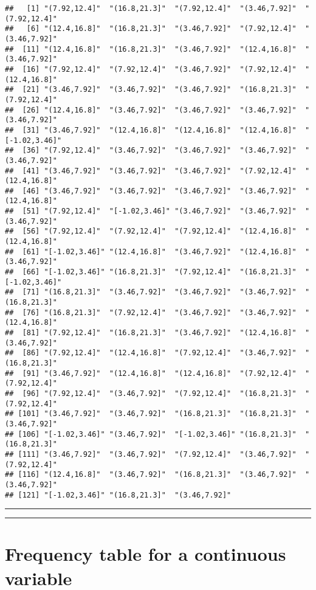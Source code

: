 \documentclass[
]{book}
\begin{document}
\begin{verbatim}
##   [1] "(7.92,12.4]"  "(16.8,21.3]"  "(7.92,12.4]"  "(3.46,7.92]"  "(7.92,12.4]" 
##   [6] "(12.4,16.8]"  "(16.8,21.3]"  "(3.46,7.92]"  "(7.92,12.4]"  "(3.46,7.92]" 
##  [11] "(12.4,16.8]"  "(16.8,21.3]"  "(3.46,7.92]"  "(12.4,16.8]"  "(3.46,7.92]" 
##  [16] "(7.92,12.4]"  "(7.92,12.4]"  "(3.46,7.92]"  "(7.92,12.4]"  "(12.4,16.8]" 
##  [21] "(3.46,7.92]"  "(3.46,7.92]"  "(3.46,7.92]"  "(16.8,21.3]"  "(7.92,12.4]" 
##  [26] "(12.4,16.8]"  "(3.46,7.92]"  "(3.46,7.92]"  "(3.46,7.92]"  "(3.46,7.92]" 
##  [31] "(3.46,7.92]"  "(12.4,16.8]"  "(12.4,16.8]"  "(12.4,16.8]"  "[-1.02,3.46]"
##  [36] "(7.92,12.4]"  "(3.46,7.92]"  "(3.46,7.92]"  "(3.46,7.92]"  "(3.46,7.92]" 
##  [41] "(3.46,7.92]"  "(3.46,7.92]"  "(3.46,7.92]"  "(7.92,12.4]"  "(12.4,16.8]" 
##  [46] "(3.46,7.92]"  "(3.46,7.92]"  "(3.46,7.92]"  "(3.46,7.92]"  "(12.4,16.8]" 
##  [51] "(7.92,12.4]"  "[-1.02,3.46]" "(3.46,7.92]"  "(3.46,7.92]"  "(3.46,7.92]" 
##  [56] "(7.92,12.4]"  "(7.92,12.4]"  "(7.92,12.4]"  "(12.4,16.8]"  "(12.4,16.8]" 
##  [61] "[-1.02,3.46]" "(12.4,16.8]"  "(3.46,7.92]"  "(12.4,16.8]"  "(3.46,7.92]" 
##  [66] "[-1.02,3.46]" "(16.8,21.3]"  "(7.92,12.4]"  "(16.8,21.3]"  "[-1.02,3.46]"
##  [71] "(16.8,21.3]"  "(3.46,7.92]"  "(3.46,7.92]"  "(3.46,7.92]"  "(16.8,21.3]" 
##  [76] "(16.8,21.3]"  "(7.92,12.4]"  "(3.46,7.92]"  "(3.46,7.92]"  "(12.4,16.8]" 
##  [81] "(7.92,12.4]"  "(16.8,21.3]"  "(3.46,7.92]"  "(12.4,16.8]"  "(3.46,7.92]" 
##  [86] "(7.92,12.4]"  "(12.4,16.8]"  "(7.92,12.4]"  "(3.46,7.92]"  "(16.8,21.3]" 
##  [91] "(3.46,7.92]"  "(12.4,16.8]"  "(12.4,16.8]"  "(7.92,12.4]"  "(7.92,12.4]" 
##  [96] "(7.92,12.4]"  "(3.46,7.92]"  "(7.92,12.4]"  "(16.8,21.3]"  "(7.92,12.4]" 
## [101] "(3.46,7.92]"  "(3.46,7.92]"  "(16.8,21.3]"  "(16.8,21.3]"  "(3.46,7.92]" 
## [106] "[-1.02,3.46]" "(3.46,7.92]"  "[-1.02,3.46]" "(16.8,21.3]"  "(16.8,21.3]" 
## [111] "(3.46,7.92]"  "(3.46,7.92]"  "(7.92,12.4]"  "(3.46,7.92]"  "(7.92,12.4]" 
## [116] "(12.4,16.8]"  "(3.46,7.92]"  "(16.8,21.3]"  "(3.46,7.92]"  "(3.46,7.92]" 
## [121] "[-1.02,3.46]" "(16.8,21.3]"  "(3.46,7.92]"
\end{verbatim}

\begin{center}\rule{0.5\linewidth}{0.5pt}\end{center}

\begin{center}\rule{0.5\linewidth}{0.5pt}\end{center}

\hypertarget{frequency-table-for-a-continuous-variable}{%
\section{Frequency table for a continuous variable}\label{frequency-table-for-a-continuous-variable}}
\end{document}
